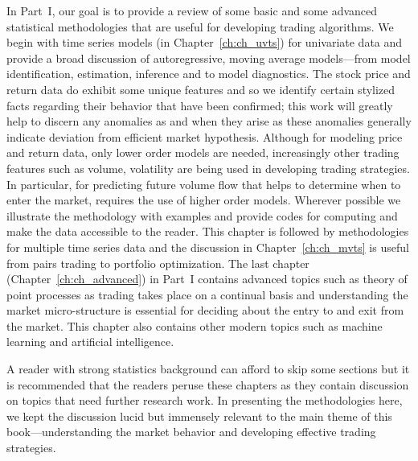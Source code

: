 
In Part~I, our goal is to provide a review of some basic and some advanced statistical methodologies that are useful for developing trading algorithms. We begin with time series models (in Chapter~\ref{ch:ch_uvts}) for univariate data and provide a broad discussion of autoregressive, moving average models---from model identification, estimation, inference and to model diagnostics. The stock price and return data do exhibit some unique features and so we identify certain stylized facts regarding their behavior that have been confirmed; this work will greatly help to discern any anomalies as and when they arise as these anomalies generally indicate deviation from efficient market hypothesis. Although for modeling price and return data, only lower order models are needed, increasingly other trading features such as volume, volatility are being used in developing trading strategies. In particular, for predicting future volume flow that helps to determine when to enter the market, requires the use of higher order models. Wherever possible we illustrate the methodology with examples and provide codes for computing and make the data accessible to the reader. This chapter is followed by methodologies for multiple time series data and the discussion in Chapter~\ref{ch:ch_mvts} is useful from pairs trading to portfolio optimization. The last chapter (Chapter~\ref{ch:ch_advanced}) in Part~I contains advanced topics such as theory of point processes as trading takes place on a continual basis and understanding the market micro-structure is essential for deciding about the entry to and exit from the market. This chapter also contains other modern topics such as machine learning and artificial intelligence. 


A reader with strong statistics background can afford to skip some sections but it is recommended that the readers peruse these chapters as they contain discussion on topics that need further research work. In presenting the methodologies here, we kept the discussion lucid but immensely relevant to the main theme of this book---understanding the market behavior and developing effective trading strategies. 